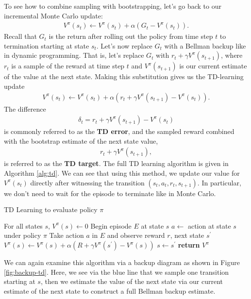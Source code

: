 \documentclass{article}
\begin{document}
To see how to combine sampling with bootstrapping, let's go back to our incremental Monte Carlo update:
\begin{align}
V^\pi(s_t) \gets V^\pi(s_t) + \alpha(G_t - V^\pi(s_t)).
\end{align}
Recall that $G_t$ is the return after rolling out the policy from time step $t$ to termination starting at state $s_t$.  Let's now replace $G_t$ with a Bellman backup like in dynamic programming.  That is, let's replace $G_t$ with $r_t + \gamma V^\pi(s_{t+1})$, where $r_t$ is a sample of the reward at time step $t$ and $V^\pi(s_{t+1})$ is our current estimate of the value at the next state.  Making this substitution gives us the TD-learning update
\begin{align}
V^\pi(s_t) \leftarrow V^\pi(s_t) + \alpha(r_t + \gamma V^\pi(s_{t+1}) - V^\pi(s_t)).
\end{align}
The difference
\begin{align}
\delta_t = r_t + \gamma V^\pi(s_{t+1}) - V^\pi(s_t)
\end{align}
is commonly referred to as the \textbf{TD error}, and the sampled reward combined with the bootstrap estimate of the next state value,
\begin{align}
r_t + \gamma V^\pi(s_{t+1}),
\end{align}
is referred to as the \textbf{TD target}.  The full TD learning algorithm is given in Algorithm \ref{alg:td}.  We can see that using this method, we update our value for $V^\pi(s_t)$ directly after witnessing the transition $(s_t, a_t, r_t, s_{t+1})$.  In particular, we don't need to wait for the episode to terminate like in Monte Carlo.

\begin{algorithm}
\caption{TD Learning to evaluate policy $\pi$}\label{alg:td}
\begin{algorithmic}[1]
\State For all states $s$, $V^\pi(s)\gets 0$
\State Begin episode $E$ at state $s$
\State $a\gets$ action at state $s$ under policy $\pi$
\State Take action $a$ in $E$ and observe reward $r$, next state $s^\prime$
\State $V^\pi(s) \gets V^\pi(s) + \alpha(R + \gamma V^\pi(s^\prime) - V^\pi(s))$
\State $s \gets s^\prime$
\EndWhile
\EndWhile
\State \textbf{return} $V^\pi$
\EndProcedure
\end{algorithmic}
\end{algorithm}

We can again examine this algorithm via a backup diagram as shown in Figure \ref{fig:backup-td}.  Here, we see via the blue line that we sample one transition starting at $s$, then we estimate the value of the next state via our current estimate of the next state to construct a full Bellman backup estimate.
\end{document}
